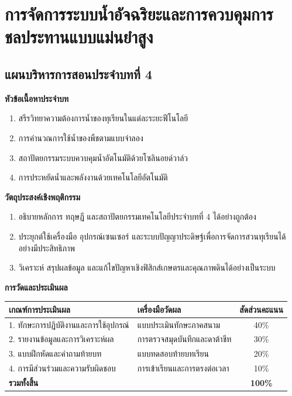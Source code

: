 \chapter{การจัดการระบบน้ำอัจฉริยะและการควบคุมการชลประทานแบบแม่นยำสูง}
\label{chap:ch04}

\section*{แผนบริหารการสอนประจำบทที่ 4}

\noindent\textbf{หัวข้อเนื้อหาประจำบท}
\begin{enumerate}
    \item สรีรวิทยาความต้องการน้ำของทุเรียนในแต่ละระยะฟีโนโลยี
    \item การคำนวณการใช้น้ำของพืชตามแบบจำลอง
    \item สถาปัตยกรรมระบบควบคุมน้ำอัตโนมัติด้วยโซลินอยด์วาล์ว
    \item การประหยัดน้ำและพลังงานด้วยเทคโนโลยีอัตโนมัติ
\end{enumerate}

\noindent\textbf{วัตถุประสงค์เชิงพฤติกรรม}
\begin{enumerate}
    \item อธิบายหลักการ ทฤษฎี และสถาปัตยกรรมเทคโนโลยีประจำบทที่ 4 ได้อย่างถูกต้อง
    \item ประยุกต์ใช้เครื่องมือ อุปกรณ์เซนเซอร์ และระบบปัญญาประดิษฐ์เพื่อการจัดการสวนทุเรียนได้อย่างมีประสิทธิภาพ
    \item วิเคราะห์ สรุปผลข้อมูล และแก้ไขปัญหาเชิงฟิสิกส์เกษตรและคุณภาพดินได้อย่างเป็นระบบ
\end{enumerate}

\noindent\textbf{การวัดและประเมินผล}
\begin{table}[H]
\centering\small
\begin{tabularx}{\textwidth}{p{} p{} c}
\toprule
\textbf{เกณฑ์การประเมินผล} & \textbf{เครื่องมือวัดผล} & \textbf{สัดส่วนคะแนน} \\
\midrule
1. ทักษะการปฏิบัติงานและการใช้อุปกรณ์ & แบบประเมินทักษะภาคสนาม & 40\% \\
2. รายงานข้อมูลและการวิเคราะห์ผล & การตรวจสมุดบันทึกและดาต้าชีท & 30\% \\
3. แบบฝึกหัดและคำถามท้ายบท & แบบทดสอบท้ายบทเรียน & 20\% \\
4. การมีส่วนร่วมและความรับผิดชอบ & การเข้าเรียนและการตรงต่อเวลา & 10\% \\
\midrule
\textbf{รวมทั้งสิ้น} & & \textbf{100\%} \\
\bottomrule
\end{tabularx}
\end{table}
\newpage

